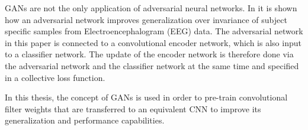 GANs are not the only application of adversarial neural networks. 
In \cite{Oezdenizci2020} it is shown how an adversarial network improves generalization over invariance of subject specific samples from Electroencephalogram (EEG) data.
The adversarial network in this paper is connected to a convolutional encoder network, which is also input to a classifier network.
The update of the encoder network is therefore done via the adversarial network and the classifier network at the same time and specified in a collective loss function.

In this thesis, the concept of GANs is used in order to pre-train convolutional filter weights that are transferred to an equivalent CNN to improve its generalization and performance capabilities.